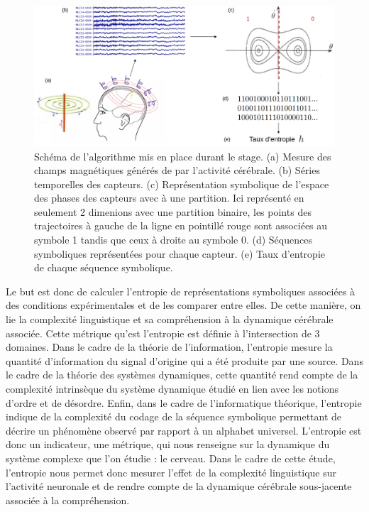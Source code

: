 \begin{figure}[!ht]
    \centering
    \includegraphics[width=17cm]{schema_algorithme.png}
    \caption{Schéma de l'algorithme mis en place durant le stage. (a) Mesure des champs magnétiques générés de par l'activité cérébrale. (b) Séries temporelles des capteurs. (c) Représentation symbolique de l'espace des phases des capteurs avec à une partition. Ici représenté en seulement 2 dimenions avec une partition binaire, les points des trajectoires à gauche de la ligne en pointillé rouge sont associées au symbole 1 tandis que ceux à droite au symbole 0. (d) Séquences symboliques représentées pour chaque capteur. (e) Taux d'entropie de chaque séquence symbolique.}
    \label{fig0.2}
\end{figure}

Le but est donc de calculer l'entropie de représentations symboliques associées à des conditions expérimentales et de les comparer entre elles. De cette manière, on lie la complexité linguistique et sa compréhension à la dynamique cérébrale associée. Cette métrique qu'est l'entropie est définie à l'intersection de 3 domaines. Dans le cadre de la théorie de l'information, l'entropie mesure la quantité d'information du signal d'origine qui a été produite par une source. Dans le cadre de la théorie des systèmes dynamiques, cette quantité rend compte de la complexité intrinsèque du système dynamique étudié en lien avec les notions d'ordre et de désordre. Enfin, dans le cadre de l'informatique théorique, l'entropie indique de la complexité du codage de la séquence symbolique permettant de décrire un phénomène observé par rapport à un alphabet universel. L'entropie est donc un indicateur, une métrique, qui nous renseigne sur la dynamique du système complexe que l'on étudie : le cerveau. Dans le cadre de cette étude, l'entropie nous permet donc mesurer l'effet de la complexité linguistique sur l'activité neuronale et de rendre compte de la dynamique cérébrale sous-jacente associée à la compréhension. 

